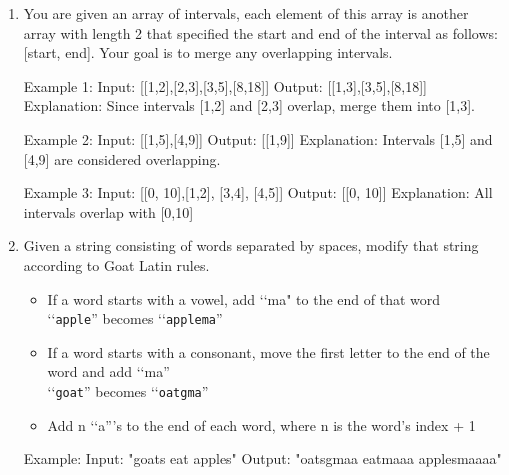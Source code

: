 \begin{enumerate}
\begin{consolethree}
Example 1:
Input: [2, 3, 1, 1, 4]
Output: true

Example 2:
Input: [3, 2, 1, 0, 4]
Output: false
\end{consolethree}
\newpage


\item You are given an array of intervals, each element of this array is another array with length 2 that specified the start and end of the interval as follows: [start, end]. Your goal is to merge any overlapping intervals.

\begin{consolethree}
Example 1:
Input: [[1,2],[2,3],[3,5],[8,18]]
Output: [[1,3],[3,5],[8,18]]
Explanation: Since intervals [1,2] and [2,3] overlap, merge them into [1,3].

Example 2:
Input: [[1,5],[4,9]]
Output: [[1,9]]
Explanation: Intervals [1,5] and [4,9] are considered overlapping.

Example 3:
Input: [[0, 10],[1,2], [3,4], [4,5]]
Output: [[0, 10]]
Explanation: All intervals overlap with [0,10]
\end{consolethree}
\newpage


\item Given a string consisting of words separated by spaces, modify that string according to Goat Latin rules.
\begin{itemize}
\item If a word starts with a vowel, add \lq\lq ma" to the end of that word\\
  \lq\lq\texttt{apple}'' becomes \lq\lq\texttt{applema}''
\item If a word starts with a consonant, move the first letter to the end of the word and add \lq\lq ma''\\
  \lq\lq\texttt{goat}'' becomes \lq\lq\texttt{oatgma}''
\item Add n \lq\lq a'''s to the end of each word, where n is the word's index + 1
\end{itemize}

\begin{consolethree}
Example:
Input: "goats eat apples"
Output: "oatsgmaa eatmaaa applesmaaaa"
\end{consolethree}
\newpage


\end{enumerate}
